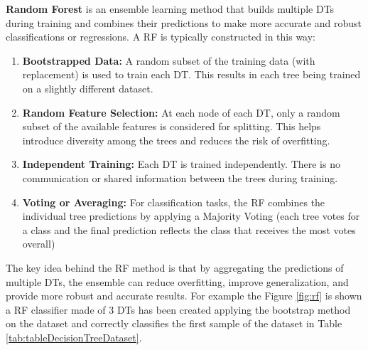 \textbf{Random Forest} is an ensemble learning method that builds multiple DTs during training and combines their predictions to make more accurate and robust classifications or regressions.
A RF is typically constructed in this way:
\begin{enumerate}
  \item \textbf{Bootstrapped Data:} A random subset of the training data (with replacement) is used to train each DT. This results in each tree being trained on a slightly different dataset.
  \item \textbf{Random Feature Selection:} At each node of each DT, only a random subset of the available features is considered for splitting. This helps introduce diversity among the trees and reduces the risk of overfitting.
  \item \textbf{Independent Training:} Each DT is trained independently. There is no communication or shared information between the trees during training.
  \item \textbf{Voting or Averaging:} For classification tasks, the RF combines the individual tree predictions by applying a Majority Voting (each tree votes for a class and the final prediction reflects the class that receives the most votes overall)
\end{enumerate}
The key idea behind the RF method is that by aggregating the predictions of multiple DTs, the ensemble can reduce overfitting, improve generalization, and provide more robust and accurate results.
For example the Figure \ref{fig:rf} is shown a RF classifier made of 3 DTs has been created applying the bootstrap method on the dataset and correctly classifies the first sample of the dataset in Table \ref{tab:tableDecisionTreeDataset}.

